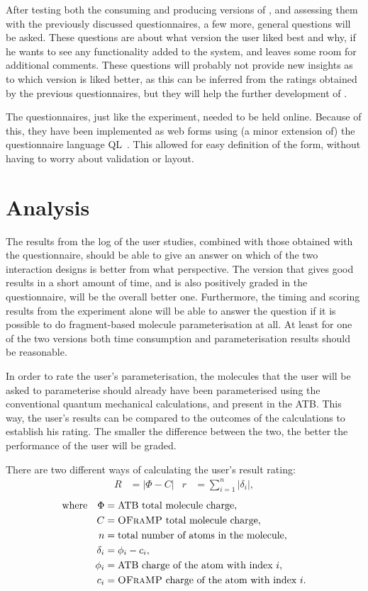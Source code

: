 After testing both the consuming and producing versions of \oframp, and assessing them with the previously discussed questionnaires, a few more, general questions will be asked. These questions are about what version the user liked best and why, if he wants to see any functionality added to the system, and leaves some room for additional comments. These questions will probably not provide new insights as to which version is liked better, as this can be inferred from the ratings obtained by the previous questionnaires, but they will help the further development of \oframp.

The questionnaires, just like the experiment, needed to be held online. Because of this, they have been implemented as web forms using (a minor extension of) the questionnaire language QL~\cite{erdweg2013state}. This allowed for easy definition of the form, without having to worry about validation or layout.



\section{Analysis}
The results from the log of the user studies, combined with those obtained with the questionnaire, should be able to give an answer on which of the two interaction designs is better from what perspective. The version that gives good results in a short amount of time, and is also positively graded in the questionnaire, will be the overall better one. Furthermore, the timing and scoring results from the experiment alone will be able to answer the question if it is possible to do fragment-based molecule parameterisation at all. At least for one of the two versions both time consumption and parameterisation results should be reasonable.

In order to rate the user's parameterisation, the molecules that the user will be asked to parameterise should already have been parameterised using the conventional quantum mechanical calculations, and present in the ATB. This way, the user's results can be compared to the outcomes of the calculations to establish his rating. The smaller the difference between the two, the better the performance of the user will be graded.

There are two different ways of calculating the user's result rating:
\begin{align*}
R &= |\Phi - C| & r &= \sum_{i = 1}^{n} |\delta_{i}|,
\end{align*}
\vspace{-1em}
\begin{align*}
\text{where} \quad \Phi &= \text{ATB total molecule charge},\\
C &= \text{\textsc{OFraMP}{} total molecule charge},\\
n &= \text{total number of atoms in the molecule},\\
\delta_{i} &= \phi_{i} - c_{i},\\
\phi_{i} &= \text{ATB charge of the atom with index}~i,\\
c_{i} &= \text{\textsc{OFraMP}{} charge of the atom with index}~i.
\end{align*}


